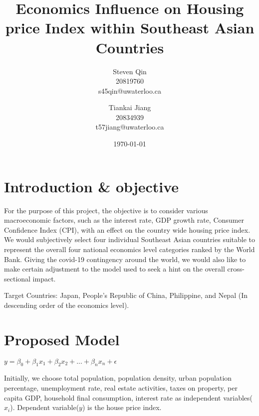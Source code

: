 \documentclass[11pt]{article}
\title{Economics Influence on Housing price Index within Southeast Asian Countries}
\author{Steven Qin\\20819760\\s45qin@uwaterloo.ca \and Tiankai Jiang\\20834939\\t57jiang@uwaterloo.ca}
\date{\today}
\begin{document}
\maketitle

\section{Introduction \& objective}\label{section-introduction}
For the purpose of this project, the objective is to consider various macroeconomic factors, such as the interest rate, GDP growth rate, Consumer Confidence Index (CPI), with an effect on the country wide housing price index. We would subjectively select four individual Southeast Asian countries suitable to represent the overall four national economics level categories ranked by the World Bank. Giving the covid-19 contingency around the world, we would also like to make certain adjustment to the model used to seek a hint on the overall cross-sectional impact.

Target Countries: Japan, People’s Republic of China, Philippine, and Nepal (In descending order of the economics level).

\section{Proposed Model}\label{section-proposedmodel}
$y = \beta_0 + \beta_1x_1 + \beta_2x_2 + ... + \beta_nx_n + \epsilon$

Initially, we choose total population, population density, urban population percentage, unemployment rate, real estate activities, taxes on property, per capita GDP, household final consumption, interest rate\citep{10.2307/23606731, 10.2139/ssrn.2431627, aei297454} as independent variables($x_i$). Dependent variable($y$) is the house price index.



\end{document}
